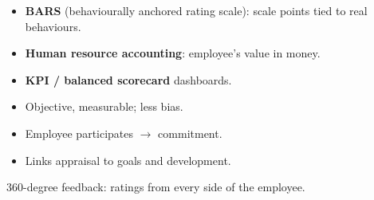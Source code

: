 {\begin{itemize}
    \added
  \item \textbf{BARS} (behaviourally anchored rating scale): scale points tied to real
    behaviours. \added
  \item \textbf{Human resource accounting}: employee's value in money. \added
  \item \textbf{KPI / balanced scorecard} dashboards. \added
\end{itemize}
\begin{itemize}
  \item Objective, measurable; less bias.
  \item Employee participates $\rightarrow$ commitment.
  \item Links appraisal to goals and development.
\end{itemize}
{\color{sub}\scriptsize 360-degree feedback: ratings from every side of the employee.}}

\vspace{2pt}


{\color{sub}\footnotesize {} }

